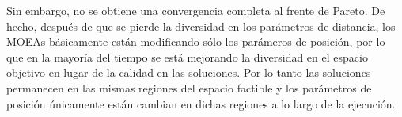 %
Sin embargo, no se obtiene una convergencia completa al frente de Pareto.
%
De hecho, después de que se pierde la diversidad en los parámetros de distancia, los MOEAs básicamente están modificando sólo los parámeros de posición, por lo que en la mayoría del tiempo se está mejorando la diversidad en el espacio objetivo en lugar de la calidad en las soluciones.
Por lo tanto las soluciones permanecen en las mismas regiones del espacio factible y los parámetros de posición únicamente están cambian en dichas regiones a lo largo de la ejecución.
%






